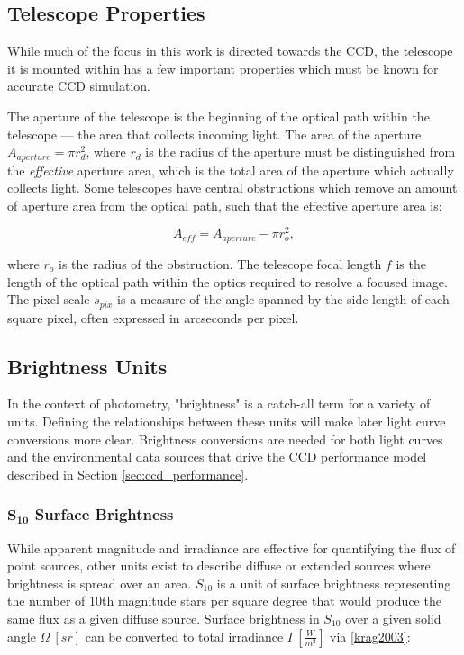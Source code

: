 \subsection{Telescope Properties} \label{sec:telescope_properties}

While much of the focus in this work is directed towards the CCD, the telescope it is mounted within has a few important properties which must be known for accurate CCD simulation. 

The aperture of the telescope is the beginning of the optical path within the telescope --- the area that collects incoming light. The area of the aperture $A_{aperture} = \pi r_{d}^2$, where $r_d$ is the radius of the aperture must be distinguished from the \textit{effective} aperture area, which is the total area of the aperture which actually collects light. Some telescopes have central obstructions which remove an amount of aperture area from the optical path, such that the effective aperture area is:

\begin{equation}
  A_{eff} = A_{aperture} - \pi r_{o}^2,
\end{equation}

where $r_o$ is the radius of the obstruction. The telescope focal length $f$ is the length of the optical path within the optics required to resolve a focused image. The pixel scale $s_{pix}$ is a measure of the angle spanned by the side length of each square pixel, often expressed in arcseconds per pixel. 

\subsection{Brightness Units}

In the context of photometry, "brightness" is a catch-all term for a variety of units. Defining the relationships between these units will make later light curve conversions more clear. Brightness conversions are needed for both light curves and the environmental data sources that drive the CCD performance model described in Section \ref{sec:ccd_performance}.

\subsubsection{$\mathbf{S_{10}}$ Surface Brightness}

While apparent magnitude and irradiance are effective for quantifying the flux of point sources, other units exist
to describe diffuse or extended sources where brightness is spread over an
area. $S_{10}$ is a unit of surface brightness representing the number of 10th magnitude stars per square degree that would produce the same flux as a given diffuse source.
Surface brightness in $S_{10}$ over a given solid angle $\Omega \: \left[ sr \right]$ can be converted to total irradiance $I \: \left[ \frac{W}{m^2} \right]$ via \ref{krag2003}:

